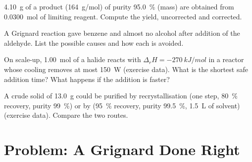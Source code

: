 \begin{exercise}[$\star\star$]\label{exo:b2:lab-techniques-2:9}
\qty{4.10}{g} of a product (\qty{164}{g/mol}) of purity 95.0~\% (mass) are obtained from \qty{0.0300}{mol}
of limiting reagent. Compute the yield, uncorrected and corrected.
\end{exercise}

\begin{exercise}[$\star\star\star$]\label{exo:b2:lab-techniques-2:10}
A Grignard reaction gave benzene and almost no alcohol after addition of the aldehyde. List the
possible causes and how each is avoided.
\end{exercise}

\begin{exercise}[$\star\star\star$]\label{exo:b2:lab-techniques-2:11}
On scale-up, \qty{1.00}{mol} of a halide reacts with $\Delta_rH = \qty{-270}{kJ/mol}$ in a reactor whose
cooling removes at most \qty{150}{W} (exercise data). What is the shortest safe addition time? What
happens if the addition is faster?
\end{exercise}

\begin{exercise}[$\star\star\star$]\label{exo:b2:lab-techniques-2:12}
A crude solid of \qty{13.0}{g} could be purified by recrystallisation (one step, 80~\% recovery, purity
99~\%) or by  (95~\% recovery, purity 99.5~\%, \qty{1.5}{L} of solvent) (exercise
data). Compare the two routes.
\end{exercise}

\section{Problem: A Grignard Done Right}

